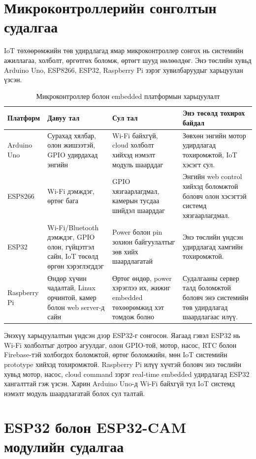 \documentclass[12pt,a4paper]{report}
\begin{document}
\section{Микроконтроллерийн сонголтын судалгаа}

IoT төхөөрөмжийн төв удирдлагад ямар микроконтроллер сонгох нь системийн ажиллагаа, холболт, өргөтгөх боломж, өртөгт шууд нөлөөлдөг. Энэ төслийн хувьд Arduino Uno, ESP8266, ESP32, Raspberry Pi зэрэг хувилбаруудыг харьцуулан үзсэн.

\begin{table}[H]
\centering
\scriptsize
\caption{Микроконтроллер болон embedded платформын харьцуулалт}
\begin{tabularx}{\textwidth}{|X|X|X|X|}
\hline
\textbf{Платформ} & \textbf{Давуу тал} & \textbf{Сул тал} & \textbf{Энэ төсөлд тохирох байдал} \\ \hline
Arduino Uno & Сурахад хялбар, олон жишээтэй, GPIO удирдахад энгийн & Wi-Fi байхгүй, cloud холболт хийхэд нэмэлт модуль шаарддаг & Зөвхөн энгийн мотор удирдлагад тохиромжтой, IoT хэсэгт сул. \\ \hline
ESP8266 & Wi-Fi дэмждэг, өртөг бага & GPIO хязгаарлагдмал, камерын тусдаа шийдэл шаарддаг & Энгийн web control хийхэд боломжтой боловч олон хэсэгтэй системд хязгаарлагдмал. \\ \hline
ESP32 & Wi-Fi/Bluetooth дэмждэг, GPIO олон, гүйцэтгэл сайн, IoT төсөлд өргөн хэрэглэгддэг & Power болон pin зохион байгуулалтыг зөв хийх шаардлагатай & Энэ төслийн үндсэн удирдлагад хамгийн тохиромжтой. \\ \hline
Raspberry Pi & Өндөр хүчин чадалтай, Linux орчинтой, камер болон web server-д сайн & Өртөг өндөр, power хэрэглээ их, жижиг embedded төхөөрөмжид хэт томдож болно & Судалгааны сервер талд боломжтой боловч энэ системийн төв удирдлагад шаардлагаас илүү. \\ \hline
\end{tabularx}
\end{table}

Энэхүү харьцуулалтын үндсэн дээр ESP32-г сонгосон. Яагаад гэвэл ESP32 нь Wi-Fi холболтыг дотроо агуулдаг, олон GPIO-той, мотор, насос, RTC болон Firebase-тэй холбогдох боломжтой, өртөг боломжийн, мөн IoT системийн prototype хийхэд тохиромжтой. Raspberry Pi илүү хүчтэй боловч энэ төслийн хувьд мотор, насос, cloud command зэрэг real-time embedded удирдлагад ESP32 хангалттай гэж үзсэн. Харин Arduino Uno-д Wi-Fi байхгүй тул IoT системд нэмэлт модуль шаардлагатай болох сул талтай.

\section{ESP32 болон ESP32-CAM модулийн судалгаа}
\end{document}
